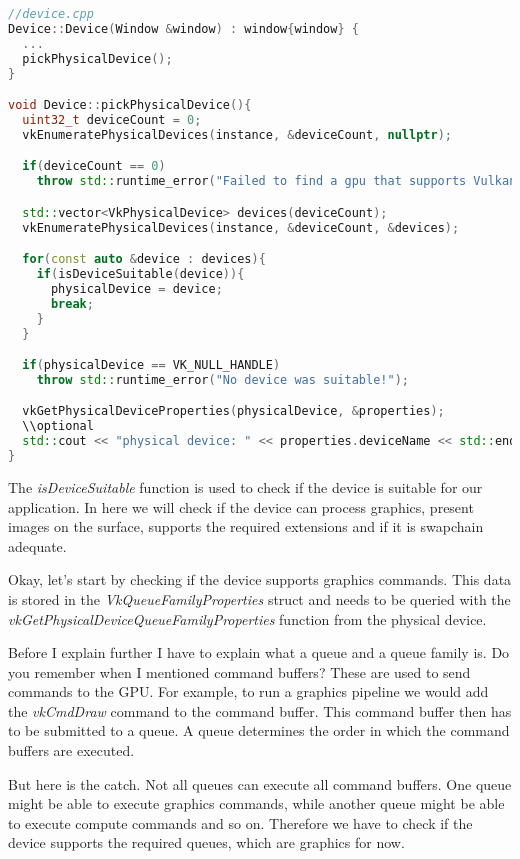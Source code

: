 \documentclass[12pt]{report} \usepackage{preamble}
\begin{document}
\begin{lstlisting}[language=C++]
//device.cpp
Device::Device(Window &window) : window{window} {
  ...
  pickPhysicalDevice();
}

void Device::pickPhysicalDevice(){
  uint32_t deviceCount = 0;
  vkEnumeratePhysicalDevices(instance, &deviceCount, nullptr);

  if(deviceCount == 0)
    throw std::runtime_error("Failed to find a gpu that supports Vulkan!");

  std::vector<VkPhysicalDevice> devices(deviceCount);
  vkEnumeratePhysicalDevices(instance, &deviceCount, &devices);

  for(const auto &device : devices){
    if(isDeviceSuitable(device)){
      physicalDevice = device;
      break;
    }
  }

  if(physicalDevice == VK_NULL_HANDLE)
    throw std::runtime_error("No device was suitable!");

  vkGetPhysicalDeviceProperties(physicalDevice, &properties);
  \\optional
  std::cout << "physical device: " << properties.deviceName << std::endl;
}
\end{lstlisting}

The \textit{isDeviceSuitable} function is used to check if the device is suitable for our application.
In here we will check if the device can process graphics, present images on the surface, supports the required extensions
and if it is swapchain adequate.

Okay, let's start by checking if the device supports graphics commands. This data is stored in
the \textit{VkQueueFamilyProperties} struct and needs to be queried with the \textit{vkGetPhysicalDeviceQueueFamilyProperties}
function from the physical device.

Before I explain further I have to explain what a queue and a queue family is. Do you remember
when I mentioned command buffers? These are used to send commands to the \ac{GPU}. For example, to run a
graphics pipeline we would add the \textit{vkCmdDraw} command to the command buffer. This command
buffer then has to be submitted to a queue. A queue determines the order in which the command buffers
are executed.

But here is the catch. Not all queues can execute all command buffers. One queue might be able to
execute graphics commands, while another queue might be able to execute compute commands and so on.
Therefore we have to check if the device supports the required queues, which are graphics for now.
\end{document}

